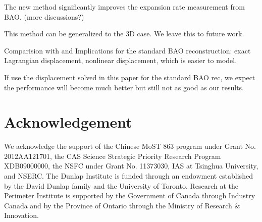 \documentclass[aps,prd,twocolumn,showpacs,superscriptaddress,groupedaddress,nofootinbib]{revtex4}  %
\begin{document}
The new method significantly
improves the expansion rate measurement from BAO. (more discussions?) 


This method can be generalized to the 3D case. 
We leave this
to future work.



Comparision with and Implications for the standard BAO reconstruction: exact 
Lagrangian displacement,
nonlinear displacement, which is easier to model.

If use the displacement solved in this paper for the standard BAO rec, we expect
the performance will become much better but still not as good as our results.

\section{Acknowledgement}
We acknowledge the support of the Chinese MoST 863 program under Grant 
No. 2012AA121701, the CAS Science Strategic Priority Research Program 
XDB09000000, the NSFC under Grant No. 11373030, IAS at Tsinghua University, 
 and NSERC.
The Dunlap Institute is funded through an endowment established by the David Dunlap family and the University of Toronto.
Research at the Perimeter Institute is supported by the Government of Canada
through Industry Canada and by the Province of Ontario through the Ministry of
Research $\&$ Innovation.



\end{document}
